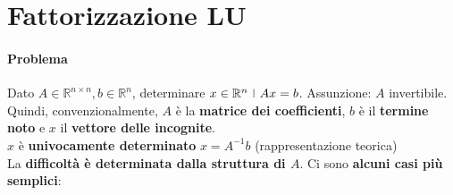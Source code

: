 \documentclass[10pt]{book}
\begin{document}
\section{Fattorizzazione LU}
\paragraph{Problema} Dato $A \in \mathbb{R}^{n \times n}, b \in \mathbb{R}^n$, determinare $x \in \mathbb{R}^n\:\:\vline\:\: Ax = b$. Assunzione: $A$ invertibile.\\
Quindi, convenzionalmente, $A$ è la \textbf{matrice dei coefficienti}, $b$ è il \textbf{termine noto} e $x$ il \textbf{vettore delle incognite}.\\
$x$ è \textbf{univocamente determinato} $x = A^{-1}b$ (rappresentazione teorica)\\
La \textbf{difficoltà è determinata dalla struttura di $A$}. Ci sono \textbf{alcuni casi più semplici}:
\end{document}

